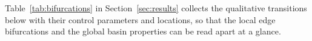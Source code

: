 Table~\ref{tab:bifurcations} in Section~\ref{sec:results} collects the
qualitative transitions below with their control parameters and locations, so
that the local edge bifurcations and the global basin properties can be read
apart at a glance.
